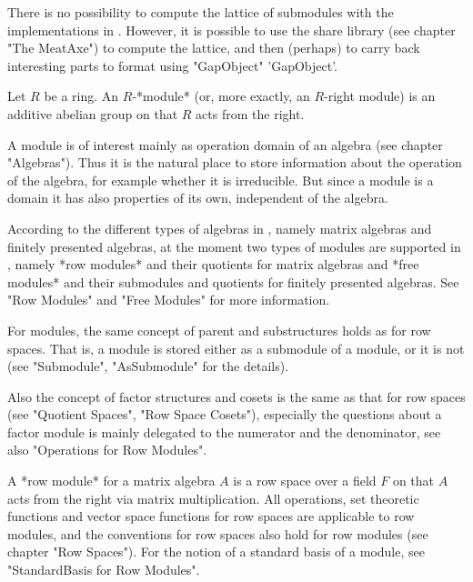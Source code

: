 There is no possibility to compute the lattice of submodules with the
implementations in {\GAP}.  However, it is possible to use the {\MeatAxe}
share library (see chapter "The MeatAxe") to compute the lattice, and then
(perhaps) to carry back interesting parts to {\GAP} format using "GapObject"
'GapObject'.


Let $R$ be a ring.  An $R$-*module* (or, more exactly, an $R$-right module)
is an additive abelian group on that $R$ acts from the right.

A module is of interest mainly as operation domain of an algebra (see chapter
"Algebras").  Thus it is the natural place to store information about the
operation of the algebra, for example whether it is irreducible.  But since
a module is a domain it has also properties of its own, independent of the
algebra.

According to the different types of algebras in {\GAP}, namely matrix
algebras and finitely presented algebras, at the moment two types of modules
are supported in {\GAP}, namely *row modules* and their quotients for
matrix algebras and *free modules* and their submodules and quotients for
finitely presented algebras.  See "Row Modules" and "Free Modules" for more
information.

For modules, the same concept of parent and substructures holds as for row
spaces.  That is, a module is stored either as a submodule of a module, or
it is not (see "Submodule", "AsSubmodule" for the details).

Also the concept of factor structures and cosets is the same as that for
row spaces (see "Quotient Spaces", "Row Space Cosets"), especially the
questions about a factor module is mainly delegated to the numerator and the
denominator, see also "Operations for Row Modules".


A *row module* for a matrix algebra $A$ is a row space over a field $F$ on
that $A$ acts from the right via matrix multiplication.  All operations, set
theoretic functions and vector space functions for row spaces are applicable
to row modules, and the conventions for row spaces also hold for row modules
(see chapter "Row Spaces").  For the notion of a standard basis of a module,
see "StandardBasis for Row Modules".


